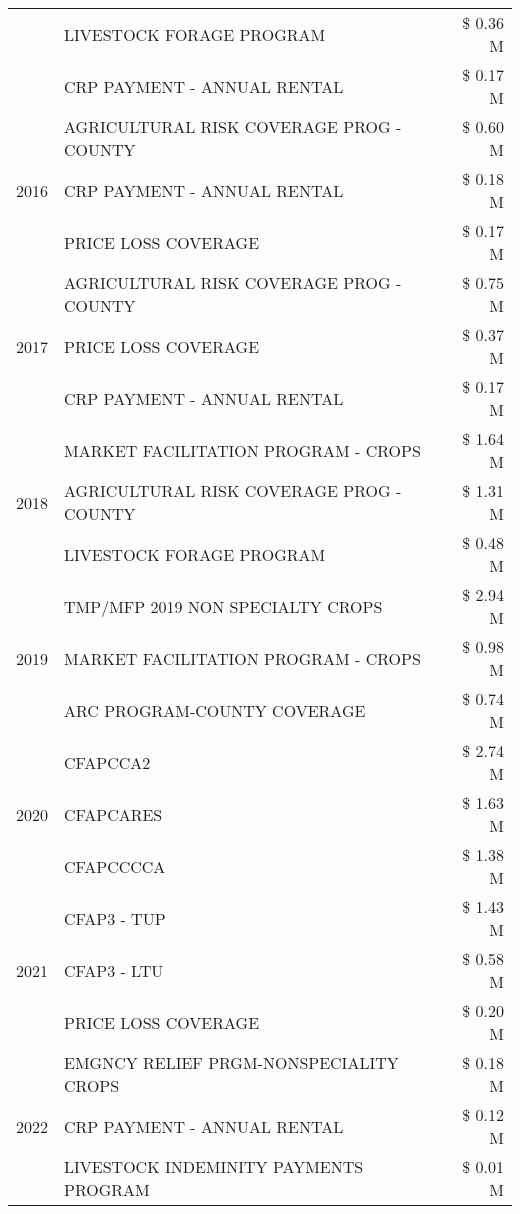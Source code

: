 \begin{tabular}{llr}
 & LIVESTOCK FORAGE PROGRAM & \$ 0.36 M \\
 & CRP PAYMENT - ANNUAL RENTAL & \$ 0.17 M \\
\cline{1-3}
\multirow[t]{3}{*}{2016} & AGRICULTURAL RISK COVERAGE PROG - COUNTY & \$ 0.60 M \\
 & CRP PAYMENT - ANNUAL RENTAL & \$ 0.18 M \\
 & PRICE LOSS COVERAGE & \$ 0.17 M \\
\cline{1-3}
\multirow[t]{3}{*}{2017} & AGRICULTURAL RISK COVERAGE PROG - COUNTY & \$ 0.75 M \\
 & PRICE LOSS COVERAGE & \$ 0.37 M \\
 & CRP PAYMENT - ANNUAL RENTAL & \$ 0.17 M \\
\cline{1-3}
\multirow[t]{3}{*}{2018} & MARKET FACILITATION PROGRAM - CROPS & \$ 1.64 M \\
 & AGRICULTURAL RISK COVERAGE PROG - COUNTY & \$ 1.31 M \\
 & LIVESTOCK FORAGE PROGRAM & \$ 0.48 M \\
\cline{1-3}
\multirow[t]{3}{*}{2019} & TMP/MFP 2019 NON SPECIALTY CROPS & \$ 2.94 M \\
 & MARKET FACILITATION PROGRAM - CROPS & \$ 0.98 M \\
 & ARC PROGRAM-COUNTY COVERAGE & \$ 0.74 M \\
\cline{1-3}
\multirow[t]{3}{*}{2020} & CFAPCCA2 & \$ 2.74 M \\
 & CFAPCARES & \$ 1.63 M \\
 & CFAPCCCCA & \$ 1.38 M \\
\cline{1-3}
\multirow[t]{3}{*}{2021} & CFAP3 - TUP & \$ 1.43 M \\
 & CFAP3 - LTU & \$ 0.58 M \\
 & PRICE LOSS COVERAGE & \$ 0.20 M \\
\cline{1-3}
\multirow[t]{3}{*}{2022} & EMGNCY RELIEF PRGM-NONSPECIALITY CROPS & \$ 0.18 M \\
 & CRP PAYMENT - ANNUAL RENTAL & \$ 0.12 M \\
 & LIVESTOCK INDEMINITY PAYMENTS PROGRAM & \$ 0.01 M \\
\cline{1-3}
\bottomrule
\end{tabular}
